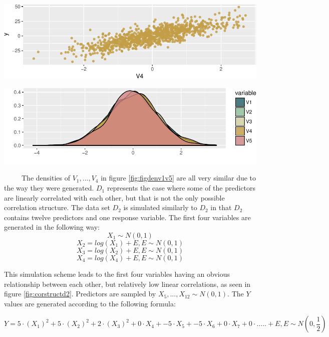 \documentclass[12pt,twoside]{reedthesis}
\let\origfigure\figure
\let\endorigfigure\endfigure
\renewenvironment{figure}[1][2] {
    \expandafter\origfigure\expandafter[H]
} {
    \endorigfigure
}
\begin{document}
  \begin{figure}[htbp]
  \centering
  \includegraphics{Thesis_files/figure-latex/figdenv4y-1.pdf}
  \caption{\label{fig:figdenv4y}Relation between V4 and Y. This relation has
  empirical linear correlation = .789}
  \end{figure}
  
  \begin{figure}[htbp]
  \centering
  \includegraphics{Thesis_files/figure-latex/unnamed-chunk-14-1.pdf}
  \caption{\label{fig:unnamed-chunk-14}\label{fig:figdenv1v5}Empirical
  densities for V1 through V4}
  \end{figure}
  
  ~~~~~The densities of \(V_1,...,V_4\) in figure \ref{fig:figdenv1v5} are
  all very similar due to the way they were generated. \(D_1\) represents
  the case where some of the predictors are linearly correlated with each
  other, but that is not the only possible correlation structure. The data
  set \(D_2\) is simulated similarly to \(D_2\) in that \(D_2\) contains
  twelve predictors and one response variable. The first four variables
  are generated in the following way: \[X_1 \sim N(0,1)\]
  \[X_2 = log(X_1) + E, E \sim N(0,1)\]
  \[X_3 = log(X_2) + E, E \sim N(0,1)\]
  \[X_4 = log(X_4) + E, E \sim N(0,1)\]
  
  This simulation scheme leads to the first four variables having an
  obvious relationship between each other, but relatively low linear
  correlations, as seen in figure \ref{fig:corstructd2}. Predictors are
  sampled by \(X_5,...,X_{12} \sim N(0,1)\). The \(Y\) values are
  generated according to the following formula:
  
  \[Y = 5 \cdot (X_1)^2 + 5 \cdot(X_2)^2 + 2 \cdot (X_3)^2 + 0 \cdot X_4 + -5 \cdot X_5 + -5\cdot X_6 + 0\cdot X_7 + 0 \cdot ..... + E, E \sim N(0,\frac 1 2 )\]
  
\end{document}
